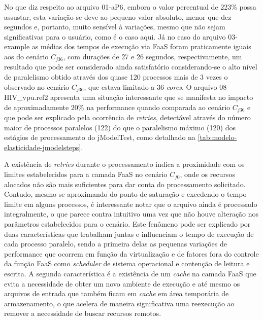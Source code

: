 \documentclass[english,brazilian]{UNISINOSmonografia} %
\begin{document}
No que diz respeito ao arquivo 01-aP6, embora o valor percentual de 223\% possa assustar, esta variação se deve ao pequeno valor absoluto, menor que dez segundos e, portanto, muito sensível à variações, mesmo que não sejam significativas para o usuário, como é o caso aqui.
%
Já no caso do arquivo 03-example as médias dos tempos de execução via FaaS foram praticamente iguais aos do cenário $C_{j36}$, com durações de 27 e 26 segundos, respectivamente, um resultado que pode ser considerado ainda satisfatório considerando-se o alto nível de paralelismo obtido através dos quase 120 processos mais de 3 vezes o observado no cenário $C_{j36}$, que estava limitado a 36 \textit{cores}.
%
O arquivo 08-HIV\_vpu.ref2 apresenta uma situação interessante que se manifesta no impacto de aproximadamente 20\% na performance quando comparada ao cenário $C_{j36}$ e que pode ser explicado pela ocorrência de \textit{retries}, detectável através do número maior de processos paralelos (122) do que o paralelismo máximo (120) dos estágios de processamento do jModelTest, como detalhado na \autoref{tab:modelo-elasticidade-jmodelsteps}.




A existência de \textit{retries} durante o processamento indica a proximidade com os limites estabelecidos para a camada FaaS no cenário $C_{f0}$, onde os recursos alocados não são mais suficientes para dar conta do processamento solicitado.
%
Contudo, mesmo se aproximando do ponto de saturação e excedendo o tempo limite em alguns processos, é interessante notar que o arquivo ainda é processado integralmente, o que parece contra intuitivo uma vez que não houve alteração nos parâmetros estabelecidos para o cenário.
%
Este fenômeno pode ser explicado por duas características que trabalham juntas e influenciam o tempo de execução de cada processo paralelo, sendo a primeira delas as pequenas variações de performance que ocorrem em função da virtualização e de fatores fora do controle da função FaaS como \textit{scheduler} de sistema operacional e contenção de leitura e escrita.
%
A segunda característica é a existência de um \textit{cache} na camada FaaS que evita a necessidade de obter um novo ambiente de execução e até mesmo os arquivos de entrada que também ficam em \textit{cache} em área temporária de armazenamento, o que acelera de maneira significativa uma reexecução ao remover a necessidade de buscar recursos remotos.
\end{document}
